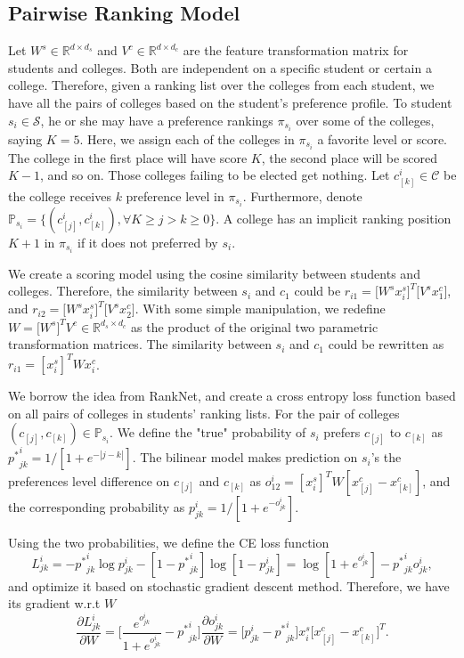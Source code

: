 \documentclass[12pt]{article}
\begin{document}
\subsection*{Pairwise Ranking Model}
Let $W^s\in \mathbb R^{d\times d_s}$ and $V^c\in \mathbb R^{d\times d_c}$ are the feature transformation matrix for students and colleges. Both are independent on a specific student or certain a college. Therefore, given a ranking list over the colleges from each student, we have all the pairs of colleges based on the student's preference profile. To student $s_i\in \mathcal S$, he or she may have a preference rankings $\pi_{s_i}$ over some of the colleges, saying $K=5$. Here, we assign each of the colleges in $\pi_{s_i}$ a favorite level or score. The college in the first place will have score $K$, the second place will be scored $K-1$, and so on. Those colleges failing to be elected get nothing. Let $c_{[k]}^i\in \mathcal C$ be the college receives $k$ preference level in $\pi_{s_i}$. Furthermore, denote $\mathbb P_{s_i} = \{(c_{[j]}^i, c_{[k]}^i), \forall K\ge j > k \ge 0\}$. A college has an implicit ranking position $K+1$ in $\pi_{s_i}$ if it does not preferred by $s_i$.

We create a scoring model using the cosine similarity between students and colleges. Therefore, the similarity between $s_i$ and $c_1$ could be $r_{i1}=\big[W^s x_i^s\big]^T\big[V^s x_1^c\big]$, and $r_{i2} = \big[W^s x_i^s\big]^T\big[V^s x_2^c\big]$.  With some simple manipulation, we redefine $W=\big[W^s]^T V^c\in \mathbb R^{d_s\times d_c}$ as the product of the original two parametric transformation matrices. The similarity between $s_i$ and $c_1$ could be rewritten as $r_{i1} = [x_i^s]^T W x_i^c$.

We borrow the idea from RankNet, and create a cross entropy loss function based on all pairs of colleges in students' ranking lists. For the pair of colleges $(c_{[j]}, c_{[k]})\in \mathbb P_{s_i}$. We define the "true" probability of $s_i$ prefers $c_{[j]}$ to $c_{[k]}$ as ${p^*}_{jk}^i = 1/[1+e^{-|j-k|}]$. The bilinear model makes prediction on $s_i$'s the preferences level difference on $c_{[j]}$ and $c_{[k]}$ as $o_{12}^i = [x_i^s]^T W [x_{[j]}^c-x_{[k]}^c]$, and the corresponding probability as $p_{jk}^i = 1/[1+e^{-o_{jk}^i}]$.

Using the two probabilities, we define the CE loss function 
\[
L_{jk}^i = -{p^*}_{jk}^i \log p_{jk}^i - [1-{p^*}_{jk}^i] \log [1-p_{jk}^i] = \log[1+e^{o_{jk}^i}] - {p^*}_{jk}^i o_{jk}^i,
\]
and optimize it based on stochastic gradient descent method. Therefore, we have its gradient w.r.t $W$
\[
\frac{\partial L_{jk}^i}{\partial W} = \Big[\frac{e^{o_{jk}^i}}{1+e^{o_{jk}^i}} - {p^*}_{jk}^i\Big] \frac{\partial o_{jk}^i}{\partial W} = \big[p_{jk}^i - {p^*}_{jk}^i\big] x_i^s \big[x_{[j]}^c-x_{[k]}^c\big]^T.
\]
\end{document}
